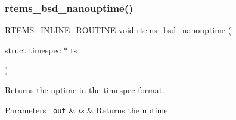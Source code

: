 \subsubsection{\texorpdfstring{rtems\_bsd\_nanouptime()}{rtems\_bsd\_nanouptime()}}
{\footnotesize\ttfamily \mbox{\hyperlink{group__RTEMSScoreBaseDefs_gac216239df231d5dbd15e3520b0b9313f}{R\+T\+E\+M\+S\+\_\+\+I\+N\+L\+I\+N\+E\+\_\+\+R\+O\+U\+T\+I\+NE}} void rtems\+\_\+bsd\+\_\+nanouptime (\begin{DoxyParamCaption}\item[{struct timespec $\ast$}]{ts }\end{DoxyParamCaption})}



Returns the uptime in the timespec format. 


\begin{DoxyParams}[1]{Parameters}
\mbox{\texttt{ out}}  & {\em ts} & Returns the uptime. \\
\hline
\end{DoxyParams}
